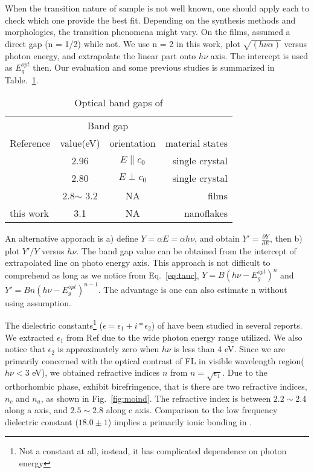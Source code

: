 When the transition nature of sample is not well known, one should apply each to check which one provide the best fit. Depending on the synthesis methods and  morphologies, the transition phenomena might vary. On the  films, \citeauthor{Bouzidi2003} assumed a direct gap (n = 1/2)\cite{Bouzidi2003} while \citeauthor{Szekeres2002} not.\cite{Szekeres2002} We use n = 2 in this work, plot $\sqrt{(h\nu \alpha)}$ versus photon energy, and extrapolate the linear part onto $h\nu$ axis. The intercept is used as $E_g^{opt}$ then. Our evaluation and some previous studies is summarized in Table.~\ref{tab:mobg}.

\begin{table}[htb]
\centering
\caption{Optical band gaps of }\label{tab:mobg}
\begin{tabular}{lccr}
\toprule
&\multicolumn{2}{c}{Band gap} \\
\cmidrule(l){2-3}
Reference & value(eV) & orientation & material states\\
\midrule
\cite{Deb1968}   & 2.96  & $E\parallel c_0$ & single crystal\\
\cite{Deb1968}   & 2.80  & $E\perp c_0$ & single crystal \\
\cite{Julien1995} & 2.8$\sim$ 3.2 & NA & films\\
 this work  & 3.1  & NA & nanoflakes\\
\bottomrule
\end{tabular}
\end{table}

An alternative apporach is a) define $Y = \alpha E=\alpha h\nu$, and obtain $Y' = \frac{\partial Y}{\partial E}$, then b) plot $Y'/Y$ versus $h\nu$. The band gap value can be obtained from the intercept of extrapolated line on photo energy axis.\cite{Choopun} This approach is not difficult to comprehend as long as we notice from Eq.~\ref{eq:tauc}, $Y = B (h\nu - E_g^{opt})^n$ and $Y' = B n(h\nu - E_g^{opt})^{n-1}$. The advantage is one can also estimate n without using assumption.

The dielectric constants\footnote{Not a constant at all, instead, it has complicated dependence on photon energy} ($\epsilon = \epsilon_1 + i*\epsilon_2$) of  have been studied in several reports.\cite{Deb1968,Sabhapathi1995,Miyata1996,Abdellaoui1997,Mondragon1999} We extracted $\epsilon_1$ from Ref\cite{Itoh2001a} due to the wide photon energy range utilized. We also notice that $\epsilon_2$ is approximately zero when $h\nu$ is less than 4 eV. Since we are primarily concerned with the optical contrast of FL  in visible wavelength region($h\nu < 3$ eV), we obtained refractive indices $n$ from $n = \sqrt{\epsilon_1}$. Due to the orthorhombic phase,  exhibit birefringence, that is there are two refractive indices, $n_c$ and $n_a$, as shown in Fig.~\ref{fig:moind}. The refractive index is between $ 2.2\sim 2.4$ along a axis, and $ 2.5\sim 2.8$ along c axis. Comparison to the low frequency dielectric constant ($18.0\pm1$) implies a primarily ionic bonding in .\cite{He2003}

